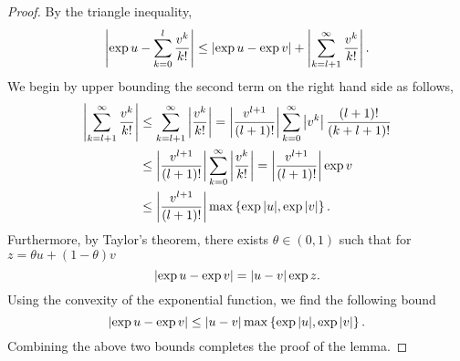 
\begin{proof}
    By the triangle inequality,
    \begin{equation*}
        \left|\exp{u} - \sum_{k=0}^l \frac{v^k}{k!}\right| \leq \left|\exp{u} - \exp{v}\right| + \left|\sum_{k=l+1}^\infty \frac{v^k}{k!}\right|.
    \end{equation*}
    We begin by upper bounding the second term on the right hand side as follows,
    \begin{align*}
        \left|\sum_{k=l+1}^\infty \frac{v^k}{k!}\right| 
        & \leq \sum_{k=l+1}^\infty \left|\frac{v^k}{k!}\right| 
        = \left|\frac{v^{l+1}}{(l+1)!}\right| \sum_{k=0}^\infty \left|v^k\right| \frac{(l+1)!}{(k + l + 1)!} \\
        & \leq \left|\frac{v^{l+1}}{(l+1)!}\right| \sum_{k=0}^\infty \left|\frac{v^k}{k!}\right|
        = \left|\frac{v^{l+1}}{(l+1)!}\right| \exp v\\
        &\leq \left|\frac{v^{l+1}}{(l+1)!}\right| \max \left\{ \exp{|u|}, \exp{|v|} \right\}.
    \end{align*}
    Furthermore, by Taylor's theorem, there exists $\theta \in (0, 1)$ such that for $z = \theta u + (1-\theta)v$
    \begin{equation*}
        \left|\exp u - \exp v\right|= \left|u - v\right| \exp z.
    \end{equation*}
    Using the convexity of the exponential function, we find the following bound
    \begin{equation*}
        \left|\exp u - \exp v\right| \leq \left|u - v\right| \max \left\{ \exp{|u|}, \exp{|v|} \right\}.
    \end{equation*}
    Combining the above two bounds completes the proof of the lemma.
\end{proof}